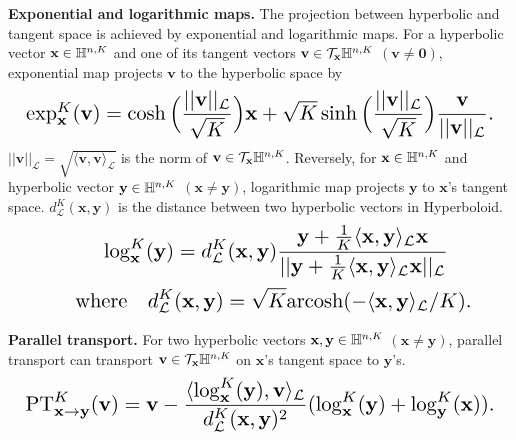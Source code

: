 \textbf{Exponential and logarithmic maps.} The projection between hyperbolic and tangent space is achieved by exponential and logarithmic maps. For a hyperbolic vector $ \textbf{x}\in\Bbb H^{n,K} $ and one of its tangent vectors $ \textbf{v}\in\mathcal{T}_{\textbf{x}}\Bbb H^{n,K} $ $ (\textbf{v}\neq \textbf{0}) $, exponential map projects $ \textbf{v} $ to the hyperbolic space by
\begin{equation}
\resizebox{1\columnwidth}{!}{
$
\exp_{\textbf{x}}^K(\textbf{v})=\cosh\Big(\dfrac{||\textbf{v}||_{\mathcal{L}}}{\sqrt{K}}\Big)\textbf{x}+\sqrt{K}\sinh\Big(\dfrac{||\textbf{v}||_{\mathcal{L}}}{\sqrt{K}}\Big)\dfrac{\textbf{v}}{||\textbf{v}||_{\mathcal{L}}}. $
}
\end{equation}
$ ||\textbf{v}||_{\mathcal{L}}=\sqrt{\langle\textbf{v},\textbf{v}\rangle_{\mathcal{L}}} $ is the norm of $ \textbf{v}\in\mathcal{T}_{\textbf{x}}\Bbb H^{n,K} $. Reversely, for $ \textbf{x}\in\Bbb H^{n,K} $ and hyperbolic vector $ \textbf{y}\in\Bbb H^{n,K} $ $ (\textbf{x}\neq\textbf{y}) $, logarithmic map projects $ \textbf{y} $ to $ \textbf{x} $'s tangent space. $ d_{\mathcal{L}}^K(\textbf{x},\textbf{y}) $ is the distance between two hyperbolic vectors in Hyperboloid.
\begin{equation}
\label{eq:log_map}
\resizebox{0.88\columnwidth}{!}{
$ \begin{split}
    \log_{\textbf{x}}^K(\textbf{y})&=d_{\mathcal{L}}^K(\textbf{x},\textbf{y})\dfrac{\textbf{y}+\frac{1}{K}\langle\textbf{x},\textbf{y}\rangle_{\mathcal{L}}\textbf{x}}{||\textbf{y}+\frac{1}{K}\langle\textbf{x},\textbf{y}\rangle_{\mathcal{L}}\textbf{x}||_{\mathcal{L}}}\\
    \text{\quad where\quad}d_{\mathcal{L}}^K&(\textbf{x},\textbf{y})=\sqrt{K}\text{arcosh}(-\langle\textbf{x},\textbf{y}\rangle_{\mathcal{L}}/K).
\end{split} $}
\end{equation}

\textbf{Parallel transport.} For two hyperbolic vectors $ \textbf{x},\textbf{y}\in\Bbb H^{n,K} $ $ (\textbf{x}\neq\textbf{y}) $, parallel transport can transport $ \textbf{v}\in\mathcal{T}_{\textbf{x}}\Bbb H^{n,K} $ on $ \textbf{x} $’s tangent space to $ \textbf{y} $’s.
\begin{equation}
\resizebox{1\columnwidth}{!}{
$
    \text{PT}^K_{\textbf{x}\rightarrow\textbf{y}}(\textbf{v})=\textbf{v}-\dfrac{\langle\log_{\textbf{x}}^K(\textbf{y}),\textbf{v}\rangle_{\mathcal{L}}}{d_{\mathcal{L}}^K(\textbf{x},\textbf{y})^2}(\log_{\textbf{x}}^K(\textbf{y})+\log_{\textbf{y}}^K(\textbf{x})). $
    }
\end{equation}